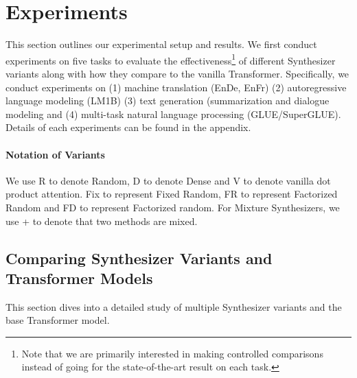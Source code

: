 \documentclass{article}
\begin{document}
\section{Experiments}
This section outlines our experimental setup and results. We first conduct experiments on five tasks to evaluate the effectiveness\footnote{Note that we are primarily interested in making controlled comparisons instead of going for the state-of-the-art result on each task.} of different Synthesizer variants along with how they compare to the vanilla Transformer. Specifically, we conduct experiments on (1) machine translation (EnDe, EnFr) (2) autoregressive language modeling (LM1B) (3) text generation (summarization and dialogue modeling and (4) multi-task natural language processing (GLUE/SuperGLUE). Details of each experiments can be found in the appendix. 

\paragraph{Notation of Variants} We use R to denote Random, D to denote Dense and V to denote vanilla dot product attention. Fix to represent Fixed Random, FR to represent Factorized Random and FD to represent Factorized random. For Mixture Synthesizers, we use + to denote that two methods are mixed.

















\subsection{Comparing Synthesizer Variants and Transformer Models}
This section dives into a detailed study of multiple Synthesizer variants and the base Transformer model. 
\end{document}
